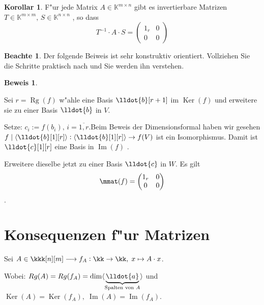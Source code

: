 \documentclass[oneside,fontsize=11pt,paper=a4,BCOR=0mm,DIV=12,automark,headsepline]{scrbook}
\DeclareMathOperator{\mdim}{dim}
\DeclareMathOperator{\mKer}{Ker}
\DeclareMathOperator{\mIm}{Im}
\DeclareMathOperator{\mRg}{Rg}
\theoremstyle{remark}
\theoremstyle{definition}
\newtheorem*{notte}{Beachte}
\newtheorem*{korollar}{Korollar}
\theoremstyle{definition}
\newtheorem*{prof}{Beweis}
\theoremstyle{remark}
\begin{document}
\begin{korollar}
  F"ur jede Matrix $A\in \mathbb{K}^{m\times n}$ gibt es invertierbare Matrizen $T\in \mathbb{K}^{m\times m},\, S \in \mathbb{K}^{n\times n}$ , so dass \[T^{-1} \cdot A \cdot S = \begin{pmatrix}
  1_r & 0 \\
  0 & 0
  \end{pmatrix}\]
\end{korollar}

\begin{notte}
	Der folgende Beiweis ist sehr konstruktiv orientiert. Vollziehen Sie die Schritte praktisch nach und Sie werden ihn verstehen.
\end{notte}
\begin{prof}
	\begin{trivlist}
		\item   Sei $r=\mRg(f)$ w"ahle eine Basis $\lldot{b}[r+1]$ im $\mKer(f)$  und erweitere sie zu einer
		Basis $\lldot{b}$ in $V$. 
		\item Setze: $c_i:=f(b_i),\, i=\overline{1,r}$.\quad Beim Beweis der Dimensionsformal haben wir
		gesehen $f\mid \langle\lldot{b}[1][r]\rangle: \langle\lldot{b}[1][r]\rangle \rightarrow f(V)$ 
		ist ein Isomorphismus. Damit ist $\lldot{c}[1][r]$ eine Basis in $\mIm(f)$ . 
		\item Erweitere dieselbe jetzt zu einer Basis $\lldot{c}$ in $W$. Es gilt \[\mmat(f)= \begin{pmatrix}
		1_r & 0 \\
		0 & 0
		\end{pmatrix}\]. 
	\end{trivlist}
\end{prof}

\section{Konsequenzen f"ur Matrizen}
\label{sec:konsma}
\begin{trivlist}
	\item Sei $A\in \kkk[n][m] \longrightarrow f_A: \kk \rightarrow \kk,\; x \mapsto A\cdot x$.
	\item Wobei: $Rg(A)=Rg(f_A)=\mdim \langle\underbrace{\lldot{a}}_{\text{Spalten von } A}\rangle$ und $\mKer(A)=\mKer(f_A),\; \mIm(A)=\mIm(f_A)$.
\end{trivlist}
\end{document}
